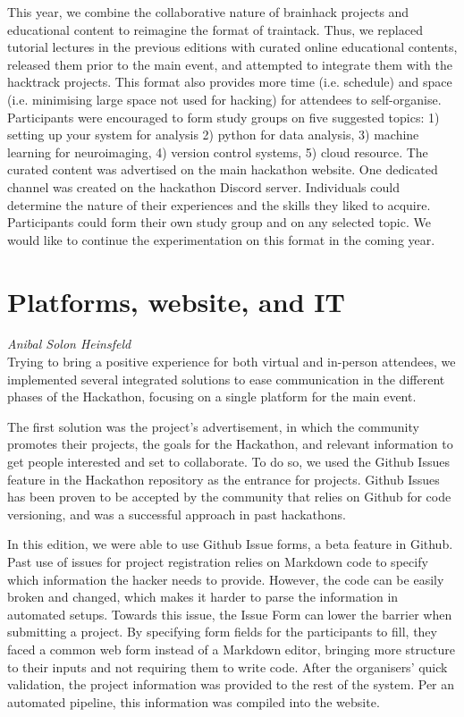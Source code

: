 \documentclass[10pt,a4paper,twocolumns]{proc}
\newcommand{\authors}[1]{\emph{\footnotesize #1} \\}
\begin{document}
This year, we combine the collaborative nature of brainhack projects and
educational content to reimagine the format of traintack. Thus, we
replaced tutorial lectures in the previous editions with curated online
educational contents, released them prior to the main event, and
attempted to integrate them with the hacktrack projects. This format
also provides more time (i.e. schedule) and space (i.e. minimising large
space not used for hacking) for attendees to self-organise. Participants
were encouraged to form study groups on five suggested topics: 1)
setting up your system for analysis 2) python for data analysis, 3)
machine learning for neuroimaging, 4) version control systems, 5) cloud
resource. The curated content was advertised on the main hackathon
website. One dedicated channel was created on the hackathon Discord
server. Individuals could determine the nature of their experiences and
the skills they liked to acquire. Participants could form their own
study group and on any selected topic. We would like to continue the
experimentation on this format in the coming year.

\section{Platforms, website, and IT}
\authors{Anibal Solon Heinsfeld}
%

Trying to bring a positive experience for both virtual and in-person
attendees, we implemented several integrated solutions to ease
communication in the different phases of the Hackathon, focusing on a
single platform for the main event.

The first solution was the project's advertisement, in which the
community promotes their projects, the goals for the Hackathon, and
relevant information to get people interested and set to collaborate. To
do so, we used the Github Issues feature in the Hackathon
repository as the entrance for projects. Github Issues has been proven
to be accepted by the community that relies on Github for code
versioning, and was a successful approach in past hackathons.

In this edition, we were able to use Github Issue forms, a beta feature
in Github. Past use of issues for project registration relies on
Markdown code to specify which information the hacker needs to provide.
However, the code can be easily broken and changed, which makes it
harder to parse the information in automated setups. Towards this issue,
the Issue Form can lower the barrier when submitting a project. By
specifying form fields for the participants to fill, they faced a common
web form instead of a Markdown editor, bringing more structure to their
inputs and not requiring them to write code. After the organisers' quick
validation, the project information was provided to the rest of the
system. Per an automated pipeline, this information was compiled into
the website.
\end{document}

